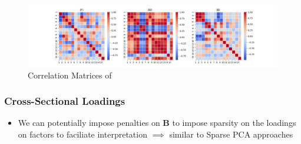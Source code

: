 \documentclass{article}
\begin{document}
\begin{figure}[H]
    \centering
    \includegraphics[width=1\linewidth]{corr.png}
    \caption{Correlation Matrices of }
    \label{fig:corr}
\end{figure}

\subsubsection{Cross-Sectional Loadings}

\begin{itemize}
    \item We can potentially impose penalties on $\bm{B}$ to impose sparsity on the loadings on factors to faciliate interpretation $\implies$ 
    similar to Sparse PCA approaches
\end{itemize}
\end{document}
